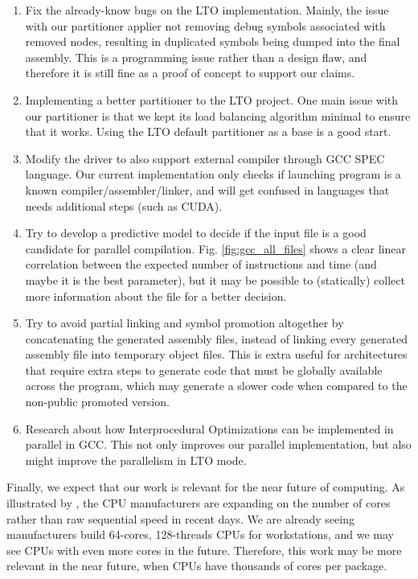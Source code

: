 \begin{enumerate}

\item Fix the already-know bugs on the LTO implementation.
Mainly, the issue with our partitioner applier not removing debug symbols
associated with removed nodes, resulting in duplicated symbols being dumped
into the final assembly. This is a programming issue rather than a design flaw,
and therefore it is still fine as a proof of concept to support our claims.

\item Implementing a better partitioner to the LTO project. One main issue
with our partitioner is that we kept its load balancing algorithm minimal to
ensure that it works. Using the LTO default partitioner as a base is a good start.

\item Modify the driver to also support external compiler through GCC
SPEC language. Our current implementation only checks if launching program
is a known compiler/assembler/linker, and will get confused in languages that
needs additional steps (such as CUDA).

\item Try to develop a predictive model to decide if the input file is
a good candidate for parallel compilation. Fig. \ref{fig:gcc_all_files} shows
a clear linear correlation between the expected number of instructions and time
(and maybe it is the best parameter), but it may be possible to (statically)
collect more information about the file for a better decision.

\item Try to avoid partial linking and symbol promotion altogether by
concatenating the generated assembly files, instead of linking every generated
assembly file into temporary object files. This is extra useful for
architectures that require extra steps to generate code that must be globally
available across the program, which may generate a slower code when compared to
the non-public promoted version.

\item Research about how Interprocedural Optimizations can be implemented
in parallel in GCC. This not only improves our parallel implementation,
but also might improve the parallelism in LTO mode.

\end{enumerate}

Finally, we expect that our work is relevant for the near future of computing.
As illustrated by \cite{42years}, the CPU manufacturers are expanding on the
number of cores rather than raw sequential speed in recent days. We are already
seeing manufacturers build 64-cores, 128-threads CPUs for workstations, and we
may see CPUs with even more cores in the future. Therefore, this work may be
more relevant in the near future, when CPUs have thousands of cores per package.
